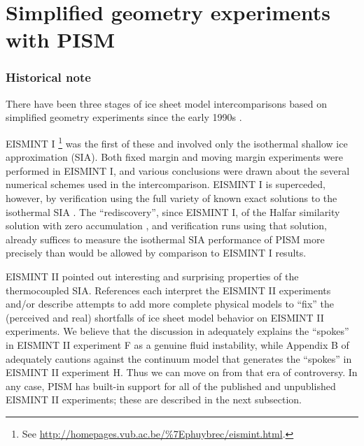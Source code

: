 
\section{Simplified geometry experiments with PISM}\label{sec:simp}

\subsubsection*{Historical note}  There have been three stages of ice sheet model intercomparisons based on simplified geometry experiments since the early 1990s \cite{BuelerSpray}.

EISMINT I \cite[ European Ice Sheet Modeling INiTiative]{EISMINT96}\footnote{See \url{http://homepages.vub.ac.be/\%7Ephuybrec/eismint.html}.} was the first of these and involved only the isothermal shallow ice approximation (SIA).  Both fixed margin and moving margin experiments were performed in EISMINT I, and various conclusions were drawn about the several numerical schemes used in the intercomparison.  EISMINT I is superceded, however, by verification using the full variety of known exact solutions to the isothermal SIA \cite{BLKCB}.  The ``rediscovery'', since EISMINT I, of the Halfar similarity solution with zero accumulation \cite{Halfar83}, and verification runs using that solution, already suffices to measure the isothermal SIA performance of PISM more precisely than would be allowed by comparison to EISMINT I results.

EISMINT II \cite{EISMINT00} pointed out interesting and surprising properties of the thermocoupled SIA.  References \cite{BBL,Hindmarsh04,Hindmarsh06,PayneBaldwin,SaitoEISMINT,BBssasliding} each interpret the EISMINT II experiments and/or describe attempts to add more complete physical models to ``fix'' the (perceived and real) shortfalls of ice sheet model behavior on EISMINT II experiments.  We believe that the discussion in \cite{PayneDongelmans,PayneBaldwin,BBL} adequately explains the ``spokes'' in EISMINT II experiment F as a genuine fluid instability, while Appendix B of \cite{BBssasliding} adequately cautions against the continuum model that generates the ``spokes'' in EISMINT II experiment H.   Thus we can move on from that era of controversy.  In any case, PISM has built-in support for all of the published and unpublished EISMINT II experiments; these are described in the next subsection.

